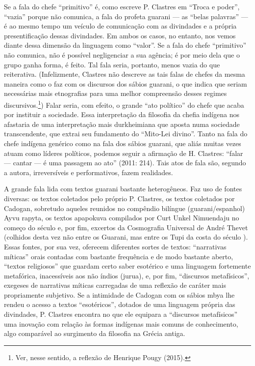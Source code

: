 Se a fala do chefe ``primitivo'' é, como escreve P. Clastres em ``Troca e
poder'', ``vazia'' porque não comunica, a fala do profeta guarani --- as
``belas palavras'' --- é ao mesmo tempo um veículo de comunicação com as
divindades e a própria presentificação dessas divindades. Em ambos os
casos, no entanto, nos vemos diante dessa dimensão da linguagem como
``valor''. Se a fala do chefe ``primitivo'' não comunica, não é possível
negligenciar a sua agência; é por meio dela que o grupo ganha forma, é
feito. Tal fala seria, portanto, menos vazia do que reiterativa.
(Infelizmente, Clastres não descreve as tais falas de chefes da mesma
maneira como o faz com os discursos dos sábios guarani, o que indica
que seriam necessárias mais etnografias para uma melhor compreensão
desses regimes discursivos.\footnote{Ver, nesse sentido, a reflexão de
Henrique Pougy (2015).}) Falar seria, com efeito, o grande ``ato
político'' do chefe que acaba por instituir a sociedade. Essa
interpretação da filosofia da chefia indígena nos afastaria de uma
interpretação mais durkheimiana que aposta numa sociedade
transcendente, que extrai seu fundamento do ``Mito-Lei divino''. Tanto na
fala do chefe indígena genérico como na fala dos sábios guarani, que
aliás muitas vezes atuam como líderes políticos, podemos seguir a
afirmação de H. Clastres: ``falar --- cantar --- é uma passagem ao ato''
(2011: 214). Tais atos de fala são, segundo a autora, irreversíveis e
performativos, fazem realidades. 

A grande fala lida com textos guarani bastante heterogêneos. Faz uso de
fontes diversas: os textos coletados pelo próprio P. Clastres, os
textos coletados por Cadogan, sobretudo aqueles reunidos no compêndio
bilíngue (guarani/espanhol) Ayvu rapyta, os textos apapokuva compilados
por Curt Unkel Nimuendaju no começo do século  e, por fim, excertos
da Cosmografia Universal de André Thevet (colhidos desta vez não entre
os Guarani, mas entre os Tupi da costa do século ). Essas fontes,
por sua vez, oferecem diferentes sortes de textos: ``narrativas míticas''
orais contadas com bastante frequência e de modo bastante aberto,
``textos religiosos'' que guardam certo saber esotérico e uma linguagem
fortemente metafórica, inacessíveis aos não índios (jurua), e, por fim,
``discursos metafísicos'', exegeses de narrativas míticas carregadas de
uma reflexão de caráter mais propriamente subjetivo. Se a intimidade de
Cadogan com os sábios mbya lhe rendeu o acesso a textos ``esotéricos'',
dotados de uma linguagem própria das divindades, P. Clastres encontra
no que ele equipara a ``discursos metafísicos'' uma inovação com relação
às formas indígenas mais comuns de conhecimento, algo comparável ao
surgimento da filosofia na Grécia antiga.

